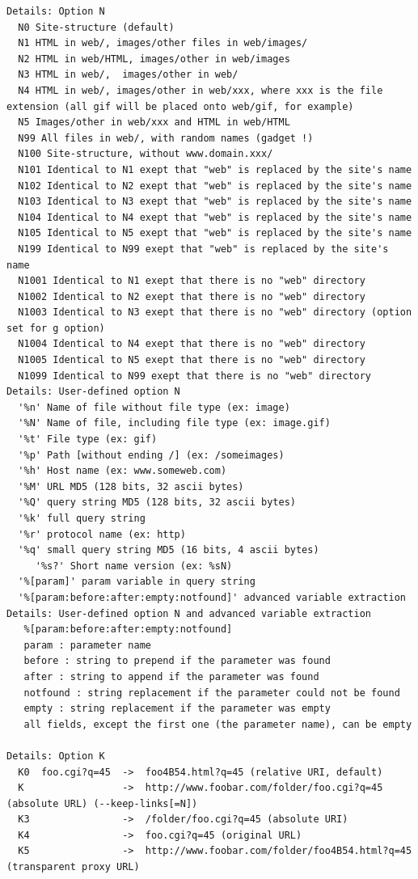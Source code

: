 \documentclass{article}
\begin{document}
\begin{lstlisting}
Details: Option N
  N0 Site-structure (default)
  N1 HTML in web/, images/other files in web/images/
  N2 HTML in web/HTML, images/other in web/images
  N3 HTML in web/,  images/other in web/
  N4 HTML in web/, images/other in web/xxx, where xxx is the file extension (all gif will be placed onto web/gif, for example)
  N5 Images/other in web/xxx and HTML in web/HTML
  N99 All files in web/, with random names (gadget !)
  N100 Site-structure, without www.domain.xxx/
  N101 Identical to N1 exept that "web" is replaced by the site's name
  N102 Identical to N2 exept that "web" is replaced by the site's name
  N103 Identical to N3 exept that "web" is replaced by the site's name
  N104 Identical to N4 exept that "web" is replaced by the site's name
  N105 Identical to N5 exept that "web" is replaced by the site's name
  N199 Identical to N99 exept that "web" is replaced by the site's name
  N1001 Identical to N1 exept that there is no "web" directory
  N1002 Identical to N2 exept that there is no "web" directory
  N1003 Identical to N3 exept that there is no "web" directory (option set for g option)
  N1004 Identical to N4 exept that there is no "web" directory
  N1005 Identical to N5 exept that there is no "web" directory
  N1099 Identical to N99 exept that there is no "web" directory
Details: User-defined option N
  '%n' Name of file without file type (ex: image)
  '%N' Name of file, including file type (ex: image.gif)
  '%t' File type (ex: gif)
  '%p' Path [without ending /] (ex: /someimages)
  '%h' Host name (ex: www.someweb.com)
  '%M' URL MD5 (128 bits, 32 ascii bytes)
  '%Q' query string MD5 (128 bits, 32 ascii bytes)
  '%k' full query string
  '%r' protocol name (ex: http)
  '%q' small query string MD5 (16 bits, 4 ascii bytes)
     '%s?' Short name version (ex: %sN)
  '%[param]' param variable in query string
  '%[param:before:after:empty:notfound]' advanced variable extraction
Details: User-defined option N and advanced variable extraction
   %[param:before:after:empty:notfound]
   param : parameter name
   before : string to prepend if the parameter was found
   after : string to append if the parameter was found
   notfound : string replacement if the parameter could not be found
   empty : string replacement if the parameter was empty
   all fields, except the first one (the parameter name), can be empty

Details: Option K
  K0  foo.cgi?q=45  ->  foo4B54.html?q=45 (relative URI, default)
  K                 ->  http://www.foobar.com/folder/foo.cgi?q=45 (absolute URL) (--keep-links[=N])
  K3                ->  /folder/foo.cgi?q=45 (absolute URI)
  K4                ->  foo.cgi?q=45 (original URL)
  K5                ->  http://www.foobar.com/folder/foo4B54.html?q=45 (transparent proxy URL)


\end{lstlisting}
\end{document}
